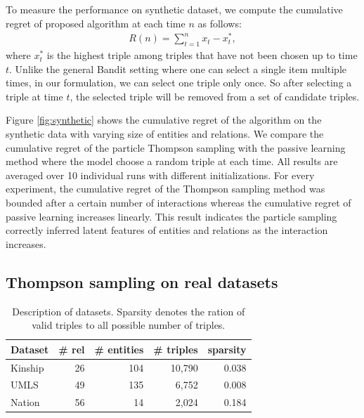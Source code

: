 To measure the performance on synthetic dataset, we compute the cumulative regret of proposed algorithm at each time $n$ as follows:
\begin{align}
R(n) = \sum_{t=1}^{n} x_t - x^{*}_t,
\end{align}
where $x^*_t$ is the highest triple among triples that have not been chosen up to time $t$. Unlike the general Bandit setting where one can select a single item multiple times, in our formulation, we can select one triple only once. So after selecting a triple at time $t$, the selected triple will be removed from a set of candidate triples.

Figure \ref{fig:synthetic} shows the cumulative regret of the algorithm on the synthetic data with varying size of entities and relations. We compare the cumulative regret of the particle Thompson sampling with the passive learning method where the model choose a random triple at each time. All results are averaged over 10 individual runs with different initializations. For every experiment, the cumulative regret of the Thompson sampling method was bounded after a certain number of interactions whereas the cumulative regret of passive learning increases linearly. This result indicates the particle sampling correctly inferred latent features of entities and relations as the interaction increases.

\subsection{Thompson sampling on real datasets}
\begin{table}[t]
\centering
\caption{\label{tbl:dataset}Description of datasets. Sparsity denotes the ration of valid triples to all possible number of triples.}
\begin{tabular}{l | r | r | r | r}
Dataset &  \# rel & \# entities & \# triples & sparsity \\ \hline
Kinship & 26 & 104  & 10,790 & 0.038 \\
UMLS & 49 &135  & 6,752 & 0.008 \\
Nation & 56 & 14  & 2,024 & 0.184 \\
\end{tabular}
\end{table}

